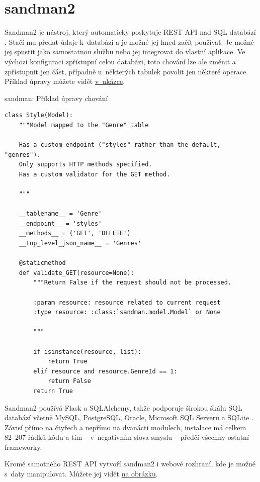 \section{sandman2}\label{sandman2}

Sandman2 je nástroj, který automaticky poskytuje REST API nad SQL databází \autocite{sandman}. Stačí mu předat údaje k~databázi a je možné jej hned začít používat. Je možné jej spustit jako samostatnou službu nebo jej integrovat do vlastní aplikace. Ve výchozí konfiguraci zpřístupní celou databázi, toto chování lze ale změnit a zpřístupnit jen část, případně u~některých tabulek povolit jen některé operace. Příklad úpravy můžete vidět \protect\hyperlink{code:sandman}{v~ukázce}.

\begin{listing}[htbp]
\caption{{\label{code:sandman}sandman: Příklad úpravy chování \autocite{sandman1gh}}}
\begin{verbatim}
class Style(Model):
    """Model mapped to the "Genre" table

    Has a custom endpoint ("styles" rather than the default, "genres").
    Only supports HTTP methods specified.
    Has a custom validator for the GET method.

    """

    __tablename__ = 'Genre'
    __endpoint__ = 'styles'
    __methods__ = ('GET', 'DELETE')
    __top_level_json_name__ = 'Genres'

    @staticmethod
    def validate_GET(resource=None):
        """Return False if the request should not be processed.

        :param resource: resource related to current request
        :type resource: :class:`sandman.model.Model` or None

        """

        if isinstance(resource, list):
            return True
        elif resource and resource.GenreId == 1:
            return False
        return True
\end{verbatim}
\end{listing}

Sandman2 používá Flask a SQLAlchemy, takže podporuje širokou škálu SQL databází včetně MySQL, PostgreSQL, Oracle, Microsoft SQL Serveru a SQLite \autocite{sandmangh}. Závisí přímo na čtyřech a nepřímo na dvanácti modulech, instalace má celkem 82~207 řádků kódu a tím -- v~negativním slova smyslu -- předčí všechny ostatní frameworky.

Kromě samotného REST API vytvoří sandman2 i webové rozhraní, kde je možné s~daty manipulovat. Můžete jej vidět \protect\hyperlink{pic:sandman}{na obrázku}.

